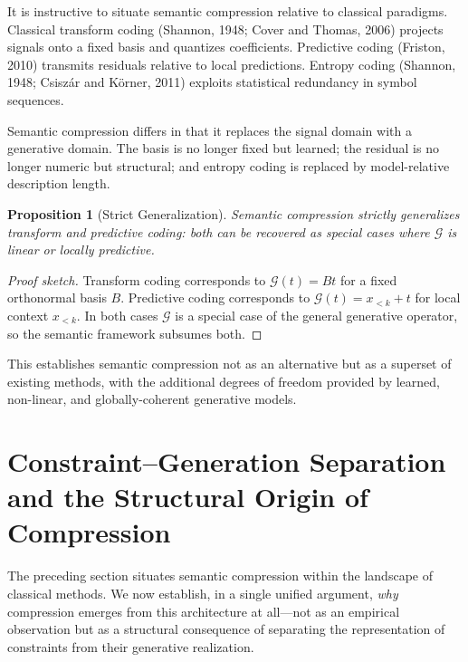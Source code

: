\documentclass[11pt,a4paper]{article}
\newtheorem{proposition}[theorem]{Proposition}
\theoremstyle{definition}
\theoremstyle{remark}
\begin{document}
It is instructive to situate semantic compression relative to classical paradigms. Classical transform coding (Shannon, 1948; Cover and Thomas, 2006) projects signals onto a fixed basis and quantizes coefficients. Predictive coding (Friston, 2010) transmits residuals relative to local predictions. Entropy coding (Shannon, 1948; Csisz\'{a}r and K\"{o}rner, 2011) exploits statistical redundancy in symbol sequences.

Semantic compression differs in that it replaces the signal domain with a generative domain. The basis is no longer fixed but learned; the residual is no longer numeric but structural; and entropy coding is replaced by model-relative description length.

\begin{proposition}[Strict Generalization]
Semantic compression strictly generalizes transform and predictive coding: both can be recovered as special cases where $\mathcal{G}$ is linear or locally predictive.
\end{proposition}

\begin{proof}[Proof sketch]
Transform coding corresponds to $\mathcal{G}(t) = B t$ for a fixed orthonormal basis $B$. Predictive coding corresponds to $\mathcal{G}(t) = x_{<k} + t$ for local context $x_{<k}$. In both cases $\mathcal{G}$ is a special case of the general generative operator, so the semantic framework subsumes both.
\end{proof}

This establishes semantic compression not as an alternative but as a superset of existing methods, with the additional degrees of freedom provided by learned, non-linear, and globally-coherent generative models.

\section{Constraint--Generation Separation and the Structural Origin of Compression}
\label{sec:constraint_generation}

The preceding section situates semantic compression within the landscape of classical methods. We now establish, in a single unified argument, \emph{why} compression emerges from this architecture at all---not as an empirical observation but as a structural consequence of separating the representation of constraints from their generative realization.
\end{document}
